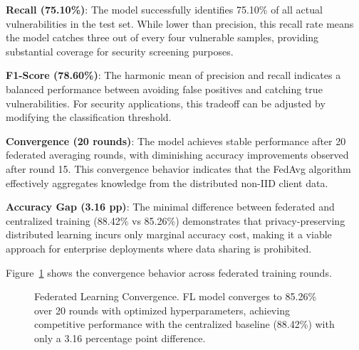 \documentclass[pdflatex,sn-mathphys-num]{sn-jnl}
\theoremstyle{thmstyleone}%
\theoremstyle{thmstyletwo}%
\theoremstyle{thmstylethree}%
\begin{document}
\textbf{Recall (75.10\%)}: The model successfully identifies 75.10\% of all actual vulnerabilities in the test set. While lower than precision, this recall rate means the model catches three out of every four vulnerable samples, providing substantial coverage for security screening purposes.

\textbf{F1-Score (78.60\%)}: The harmonic mean of precision and recall indicates a balanced performance between avoiding false positives and catching true vulnerabilities. For security applications, this tradeoff can be adjusted by modifying the classification threshold.

\textbf{Convergence (20 rounds)}: The model achieves stable performance after 20 federated averaging rounds, with diminishing accuracy improvements observed after round 15. This convergence behavior indicates that the FedAvg algorithm effectively aggregates knowledge from the distributed non-IID client data.

\textbf{Accuracy Gap (3.16 pp)}: The minimal difference between federated and centralized training (88.42\% vs 85.26\%) demonstrates that privacy-preserving distributed learning incurs only marginal accuracy cost, making it a viable approach for enterprise deployments where data sharing is prohibited.

Figure~\ref{fig:fl_convergence} shows the convergence behavior across federated training rounds.

\begin{figure}[h]
\centering
{}
\caption{Federated Learning Convergence. FL model converges to 85.26\% over 20 rounds with optimized hyperparameters, achieving competitive performance with the centralized baseline (88.42\%) with only a 3.16 percentage point difference.}
\label{fig:fl_convergence}
\end{figure}
\end{document}
